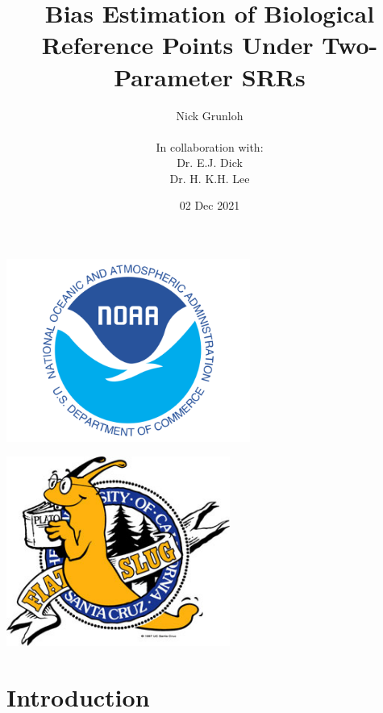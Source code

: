 \documentclass[ xcolor = pdftex, dvipsnames, table ]{beamer}
\title{Bias Estimation of Biological Reference Points Under Two-Parameter SRRs}
\author{
Nick Grunloh\\$~$\\
In collaboration with:\\
Dr. E.J. Dick\\
Dr. H. K.H. Lee
}
\date{02 Dec 2021}
\begin{document}
\begin{frame}
\titlepage
\vspace*{-3cm}
\begin{minipage}[h!]{0.49\textwidth}
\hspace*{-0.25cm}
\includegraphics[width=0.6\textwidth]{noaaText.png}
\end{minipage}
\begin{minipage}[h!]{0.49\textwidth}
\hspace*{2cm}
\includegraphics[width=0.55\textwidth]{slug.jpg}
\end{minipage}
\end{frame}

%
\section{Introduction}
\subsection{}
\end{document}
